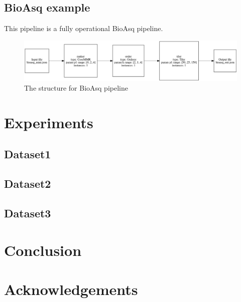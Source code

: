 \documentclass{article}
\begin{document}
    \subsection{BioAsq example}
    This pipeline is a fully operational BioAsq pipeline.

    \begin{figure}[H]
        \begin{center}
            \includegraphics[width=\textwidth]{fig/bioasq_pipeline.png}
        \end{center}
        \label{fig:bioasq_pipeline}
        \caption{The structure for BioAsq pipeline}
    \end{figure}


\section{Experiments}
    \subsection{Dataset1}
    \subsection{Dataset2}
    \subsection{Dataset3}

\section{Conclusion}

\section*{Acknowledgements}
\end{document}
